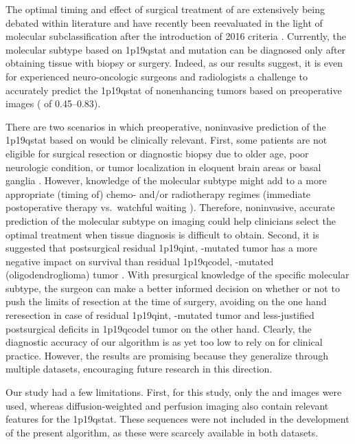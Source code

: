 The optimal timing and effect of surgical treatment of  are extensively being debated within literature and have recently been reevaluated in the light of molecular subclassification after the introduction of  2016 criteria \autocite{wijnenga2017impact, clark2019extent, jakola2017surgical, jiang2017biopsy}.
Currently, the molecular subtype based on \acl{1p19qstat} and  mutation can be diagnosed only after obtaining tissue with biopsy or surgery.
Indeed, as our results suggest, it is even for experienced neuro-oncologic surgeons and radiologists a challenge to accurately predict the \acl{1p19qstat} of nonenhancing tumors based on preoperative  images ( of \numrange{0.45}{0.83}).

There are two scenarios in which preoperative, noninvasive prediction of the \acl{1p19qstat} based on  would be clinically relevant.
First, some patients are not eligible for surgical resection or diagnostic biopsy due to older age, poor neurologic condition, or tumor localization in eloquent brain areas or basal ganglia \autocite{jiang2017biopsy}.
However, knowledge of the molecular  subtype might add to a more appropriate (timing of) chemo- and/or radiotherapy regimes (immediate postoperative therapy vs.\ watchful waiting \autocite{ricard2007dynamic}).
Therefore, noninvasive, accurate prediction of the molecular subtype on imaging could help clinicians select the optimal treatment when tissue diagnosis is difficult to obtain.
Second, it is suggested that postsurgical residual \acl{1p19qint}, -mutated tumor has a more negative impact on survival than residual \acl{1p19qcodel}, -mutated (oligodendroglioma) tumor \autocite{wijnenga2017impact, clark2019extent}.
With presurgical knowledge of the specific molecular subtype, the surgeon can make a better informed decision on whether or not to push the limits of resection at the time of surgery, avoiding on the one hand reresection in case of residual \acl{1p19qint}, -mutated tumor and less-justified postsurgical deficits in \acl{1p19qcodel} tumor on the other hand.
Clearly, the diagnostic accuracy of our algorithm is as yet too low to rely on for clinical practice.
However, the results are promising because they generalize through multiple datasets, encouraging future research in this direction.

Our study had a few limitations.
First, for this study, only the  and  images were used, whereas diffusion-weighted and perfusion imaging also contain relevant features for the \acl{1p19qstat}.
These sequences were not included in the development of the present algorithm, as these were scarcely available in both datasets.

